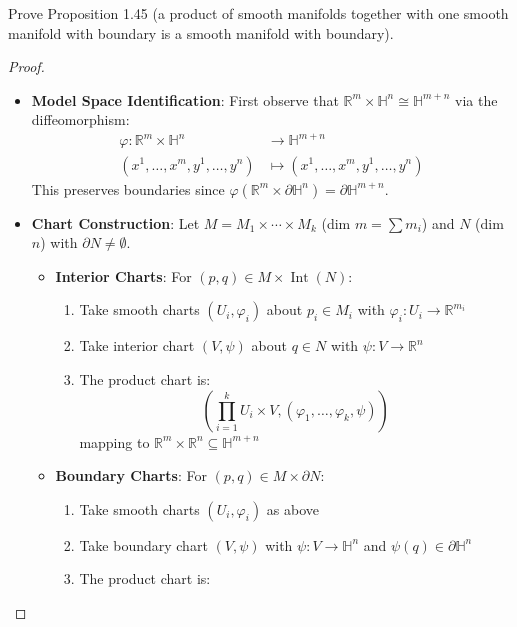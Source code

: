 \begin{problem}
  Prove Proposition 1.45 (a product of smooth manifolds together with one smooth manifold with boundary is a smooth manifold with boundary).
  \begin{proof}
  \begin{itemize}
    \item \textbf{Model Space Identification}: 
      First observe that $\mathbb{R}^m \times \mathbb{H}^n \cong \mathbb{H}^{m+n}$ via the diffeomorphism:
      \begin{align*}
        \varphi \colon \mathbb{R}^m \times \mathbb{H}^n &\to \mathbb{H}^{m+n} \\
        (x^1,\ldots,x^m,y^1,\ldots,y^n) &\mapsto (x^1,\ldots,x^m,y^1,\ldots,y^n)
      \end{align*}
      This preserves boundaries since $\varphi(\mathbb{R}^m \times \partial\mathbb{H}^n) = \partial\mathbb{H}^{m+n}$.
      \item \textbf{Chart Construction}:
        Let $M = M_1 \times \cdots \times M_k$ (dim $m = \sum m_i$) and $N$ (dim $n$) with $\partial N \neq \emptyset$.
        \begin{itemize}
          \item \textbf{Interior Charts}: For $(p,q) \in M \times \operatorname{Int}(N)$:
          \begin{enumerate}
            \item Take smooth charts $(U_i,\varphi_i)$ about $p_i \in M_i$ with $\varphi_i \colon U_i \to \mathbb{R}^{m_i}$
            \item Take interior chart $(V,\psi)$ about $q \in N$ with $\psi \colon V \to \mathbb{R}^n$
            \item The product chart is:
              $$
              \left( \prod_{i=1}^k U_i \times V, (\varphi_1,\ldots,\varphi_k,\psi) \right)
              $$
              mapping to $\mathbb{R}^m \times \mathbb{R}^n \subseteq \mathbb{H}^{m+n}$
          \end{enumerate}
          \item \textbf{Boundary Charts}: For $(p,q) \in M \times \partial N$:   
          \begin{enumerate}
            \item Take smooth charts $(U_i,\varphi_i)$ as above
            \item Take boundary chart $(V,\psi)$ with $\psi \colon V \to \mathbb{H}^n$ and $\psi(q) \in \partial\mathbb{H}^n$
            \item The product chart is:

\end{enumerate}
\end{itemize}
\end{itemize}
\end{proof}
\end{problem}
